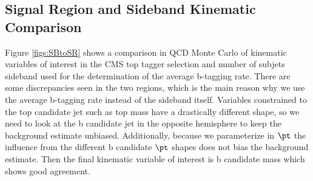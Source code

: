 


\subsection{Signal Region and Sideband Kinematic Comparison}
\label{sec:SBvsSR}
Figure \ref{figs:SBtoSR} shows a comparison in QCD Monte Carlo of kinematic variables of interest in the CMS top tagger selection and number of subjets sideband used for the determination of the average b-tagging rate.  There are some discrepancies 
seen in the two regions, which is the main reason why we use the average b-tagging rate instead of the sideband itself.  Variables constrained to the top candidate jet such as top mass have a drastically different shape, so we need to look at the 
b candidate jet in the opposite hemisphere to keep the background estimate unbiased.  Additionally, because we parameterize in $\pt$ the influence from the different b candidate $\pt$ shapes does not bias the background estimate.  Then the final 
kinematic variable of interest is b candidate mass which shows good agreement.  


